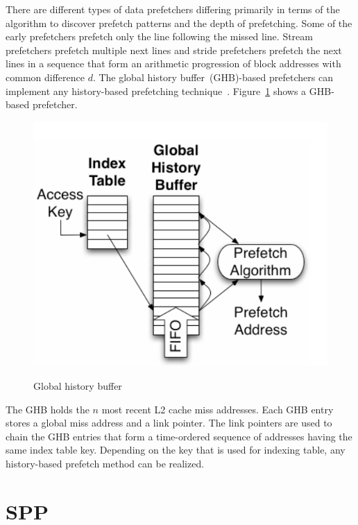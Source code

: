  There are different types of data prefetchers differing primarily in terms of the algorithm to discover prefetch patterns and the depth of prefetching. Some of the early prefetchers prefetch only the line following the missed line. Stream prefetchers prefetch multiple next lines and stride prefetchers prefetch the next lines in a sequence that form an arithmetic progression of block addresses with common difference $d$. The global history buffer~(GHB)-based prefetchers can implement any history-based prefetching technique~\cite{Data Cache Prefetching Using a Global History Buffer}. Figure~\ref{fig:ghb} shows a GHB-based prefetcher. 
 \begin{figure}[H]
 {\includegraphics[scale=0.4]{images/GHB.png}}\par\medskip
 \caption{Global history buffer~\cite{Data Cache Prefetching Using a Global   History Buffer}}
 \label{fig:ghb}
 \end{figure}
 The GHB holds the $n$ most recent L2 cache miss addresses. Each GHB entry stores a global miss address and a link pointer. The link pointers are used to chain the GHB entries that form a time-ordered sequence of addresses having the same index table key. Depending on the key that is 
 used for indexing table, any history-based prefetch method can be realized. 

 \section{SPP}

